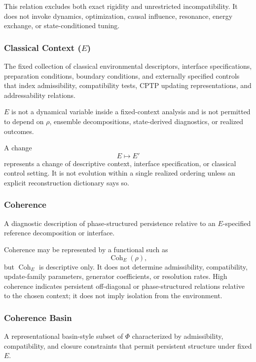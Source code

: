 \documentclass[aps,prx,onecolumn,11pt]{revtex4-2}
\theoremstyle{plain}
\theoremstyle{definition}
\theoremstyle{remark}
\newcommand{\Coh}{\operatorname{Coh}}       %
\begin{document}
This relation excludes both exact rigidity and unrestricted
incompatibility. It does not invoke dynamics, optimization, causal
influence, resonance, energy exchange, or state-conditioned tuning.

\subsubsection*{Classical Context (\texorpdfstring{\(E\)}{E})}
\label{gloss:classical_context_E}

The fixed collection of classical environmental descriptors, interface
specifications, preparation conditions, boundary conditions, and
externally specified controls that index admissibility, compatibility
tests, CPTP updating representations, and addressability relations.

\(E\) is not a dynamical variable inside a fixed-context analysis and
is not permitted to depend on \(\rho\), ensemble decompositions,
state-derived diagnostics, or realized outcomes.

A change
\[
E\mapsto E'
\]
represents a change of descriptive context, interface specification, or
classical control setting. It is not evolution within a single realized
ordering unless an explicit reconstruction dictionary says so.

\subsubsection*{Coherence}

A diagnostic description of phase-structured persistence relative to an
\(E\)-specified reference decomposition or interface.

Coherence may be represented by a functional such as
\[
\Coh_E(\rho),
\]
but \(\Coh_E\) is descriptive only. It does not determine
admissibility, compatibility, update-family parameters, generator
coefficients, or resolution rates. High coherence indicates persistent
off-diagonal or phase-structured relations relative to the chosen
context; it does not imply isolation from the environment.

\subsubsection*{Coherence Basin}

A representational basin-style subset of \(\Phi\) characterized by
admissibility, compatibility, and closure constraints that permit
persistent structure under fixed \(E\).
\end{document}
